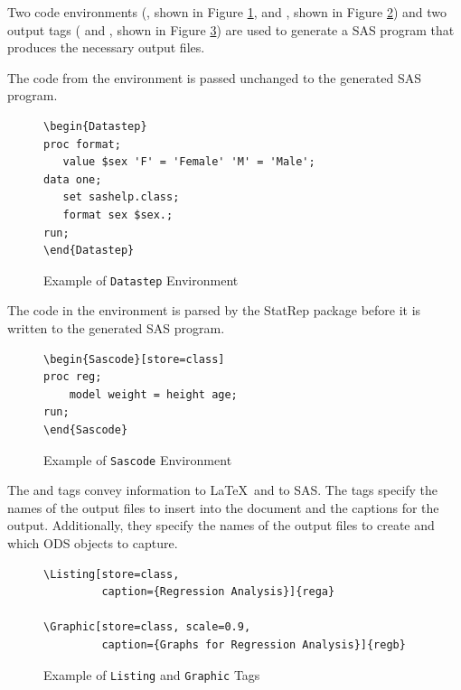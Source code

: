 \documentclass[article,oneside]{memoir}
\newcommand*{\StatRep}{\textsf{StatRep}\xspace}
\begin{document}
  Two code environments
  (, shown in Figure \ref{fig:d1}, and
  , shown in Figure \ref{fig:s1})
  and two output tags
  ( and , shown in Figure \ref{fig:slg})
  are used to generate a SAS program that produces
  the necessary output files.

  The code from the  environment is passed unchanged to the
  generated SAS program.
\begin{figure}[H]
\begin{snugshade}
\begin{verbatim}
\begin{Datastep}
proc format;
   value $sex 'F' = 'Female' 'M' = 'Male';
data one;
   set sashelp.class;
   format sex $sex.;
run;
\end{Datastep}
\end{verbatim}
\end{snugshade}
\caption{Example of \texttt{Datastep} Environment}\label{fig:d1}
\end{figure}

  The code in the  environment is parsed by the \StatRep package before it is
  written to the generated SAS program.

\begin{figure}[H]
\begin{snugshade}
\begin{verbatim}
\begin{Sascode}[store=class]
proc reg;
    model weight = height age;
run;
\end{Sascode}
\end{verbatim}
\end{snugshade}
\caption{Example of \texttt{Sascode} Environment}\label{fig:s1}
\end{figure}

  The  and  tags convey information to \LaTeX\ and to SAS.
  The tags specify the names of the output files to insert into the document
  and the captions for the output.
  Additionally, they specify the names of the output files to create and which
  ODS objects to capture.

\begin{figure}[H]
\begin{snugshade}
\begin{verbatim}
\Listing[store=class,
         caption={Regression Analysis}]{rega}

\Graphic[store=class, scale=0.9,
         caption={Graphs for Regression Analysis}]{regb}
\end{verbatim}
\end{snugshade}
\caption{Example of \texttt{Listing} and \texttt{Graphic} Tags}\label{fig:slg}
\end{figure}
\end{document}
